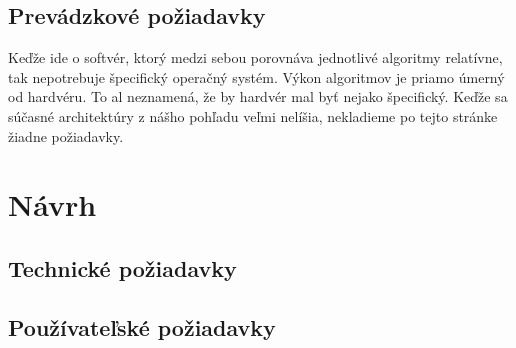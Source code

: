 \subsection{Prevádzkové požiadavky}

Keďže ide o softvér, ktorý medzi sebou porovnáva jednotlivé algoritmy 
relatívne, tak nepotrebuje špecifický operačný systém. Výkon algoritmov je 
priamo úmerný od hardvéru. To al neznamená, že by hardvér mal byť nejako 
špecifický. Keďže sa súčasné architektúry z nášho pohľadu veľmi nelíšia, 
nekladieme po tejto stránke žiadne požiadavky.



\section{Návrh}



\subsection{Technické požiadavky}


\subsection{Používateľské požiadavky}

